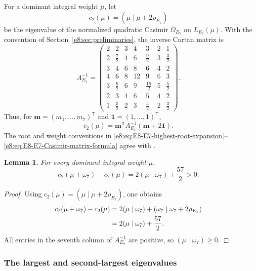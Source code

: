 \documentclass[11pt,reqno]{amsart}
\newtheorem{lemma}[theorem]{Lemma}
\theoremstyle{definition}
\theoremstyle{remark}
\begin{document}
For a dominant integral weight $\mu$, let
\begin{equation*}
  c_2(\mu)
  =(\mu\mid\mu+2\rho_{E_7})
\end{equation*}
be the eigenvalue of the normalized quadratic Casimir $\Omega_{E_7}$ on
$L_{E_7}(\mu)$.  With the convention of
Section~\ref{e8:sec:preliminaries}, the inverse Cartan matrix is
\begin{equation}
 A_{E_7}^{-1}
 =\begin{pmatrix}
 2&2&3&4&3&2&1\\
 2&\frac72&4&6&\frac92&3&\frac32\\
 3&4&6&8&6&4&2\\
 4&6&8&12&9&6&3\\
 3&\frac92&6&9&\frac{15}{2}&5&\frac52\\
 2&3&4&6&5&4&2\\
 1&\frac32&2&3&\frac52&2&\frac32
 \end{pmatrix}.
 \label{e8:eq:E8-E7-inverse-Cartan-matrix}
\end{equation}
Thus, for
$\mathbf m=(m_1,\dots,m_7)^{\mathsf T}$ and
$\mathbf 1=(1,\dots,1)^{\mathsf T}$,
\begin{equation}
  c_2(\mu)
  =\mathbf m^{\mathsf T}A_{E_7}^{-1}
    (\mathbf m+2\mathbf 1).
  \label{e8:eq:E8-E7-Casimir-matrix-formula}
\end{equation}
The root and weight conventions in
\eqref{e8:eq:E8-E7-highest-root-expansion}--
\eqref{e8:eq:E8-E7-Casimir-matrix-formula} agree with
\cite[Planche~VI]{Bourbaki2002}.

\begin{lemma}
\label{e8:lem:E8-Casimir-increases-in-omega7}
For every dominant integral weight $\mu$,
\begin{equation*}
  c_2(\mu+\omega_7)-c_2(\mu)
  =2(\mu\mid\omega_7)+\frac{57}{2}>0.
\end{equation*}
\end{lemma}

\begin{proof}
Using $c_2(\mu)=(\mu\mid\mu+2\rho_{E_7})$, one obtains
\begin{align*}
 c_2(\mu+\omega_7)-c_2(\mu)
 &=2(\mu\mid\omega_7)
   +(\omega_7\mid\omega_7+2\rho_{E_7})
 \notag\\
 &=2(\mu\mid\omega_7)+\frac{57}{2}.
\end{align*}
All entries in the seventh column of
$A_{E_7}^{-1}$ are positive, so $(\mu\mid\omega_7)\ge0$.
\end{proof}

\subsubsection{The largest and second-largest eigenvalues}
\end{document}
